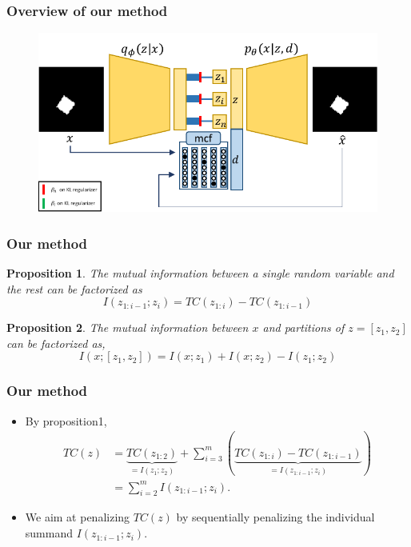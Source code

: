 \documentclass[10pt,mathserif]{beamer}
\newtheorem{prop}{Proposition}
\begin{document}
\begin{frame}
\frametitle{Overview of our method}
\begin{figure}
\includegraphics[page=2, width=\linewidth]{arch}
\end{figure}
\end{frame} 

\begin{frame}
\frametitle{Our method}
\begin{prop}
The mutual information between a single random variable and the rest can be factorized as
\[I(z_{1:i-1}; z_i) = TC(z_{1:i}) - TC(z_{1:i-1})\]
\end{prop}
\begin{prop}
The mutual information between $x$ and partitions of $z = [z_1, z_2]$ can be factorized as,
\[I(x; [z_1, z_2]) = I(x;z_1) + I(x; z_2) - I(z_1; z_2)\]
\end{prop}
\end{frame}

\begin{frame}
\frametitle{Our method}
\begin{itemize}\itemsep=12pt
\item By proposition1,
\begin{align}
TC(z)&=\underbrace{TC(z_{1:2})}_{= I(z_1; z_2)} + \sum_{i=3}^m \left( \underbrace{TC(z_{1:i}) - TC(z_{1:i-1})}_{= I(z_{1:i-1}; z_i)} \right)\nonumber\\
&= \sum_{i=2}^m I(z_{1:i-1}; z_i).\nonumber
\end{align}
\pause
\item We aim at penalizing $TC(z)$ by sequentially penalizing the individual summand $I(z_{1:i-1};z_i)$.
\end{itemize}
\end{frame}
\end{document}

